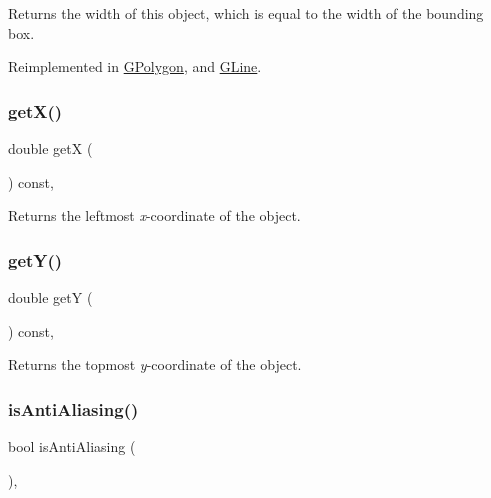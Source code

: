 Returns the width of this object, which is equal to the width of the bounding box. 



Reimplemented in \mbox{\hyperlink{classGPolygon_a0ed2965abd4f5701d2cadf71239faf19}{G\+Polygon}}, and \mbox{\hyperlink{classGLine_a04bee94b66c8f921cd8611be2460ba9d}{G\+Line}}.

\mbox{\label{classGObject_a344385751bee0720059403940d57a13e}} 
\subsubsection{\texorpdfstring{get\+X()}{getX()}}
{\footnotesize\ttfamily double getX (\begin{DoxyParamCaption}{ }\end{DoxyParamCaption}) const\hspace{0.3cm}{\ttfamily [virtual]}, {\ttfamily [inherited]}}



Returns the leftmost {\itshape x}-\/coordinate of the object. 

\mbox{\label{classGObject_aafa51c7f8f38a09febbb9ce7853f77b4}} 
\subsubsection{\texorpdfstring{get\+Y()}{getY()}}
{\footnotesize\ttfamily double getY (\begin{DoxyParamCaption}{ }\end{DoxyParamCaption}) const\hspace{0.3cm}{\ttfamily [virtual]}, {\ttfamily [inherited]}}



Returns the topmost {\itshape y}-\/coordinate of the object. 

\mbox{\label{classGObject_a93be0e1fe1b1bf1a1da732470c94f42b}} 
\subsubsection{\texorpdfstring{is\+Anti\+Aliasing()}{isAntiAliasing()}}
{\footnotesize\ttfamily bool is\+Anti\+Aliasing (\begin{DoxyParamCaption}{ }\end{DoxyParamCaption})\hspace{0.3cm}{\ttfamily [static]}, {\ttfamily [inherited]}}



